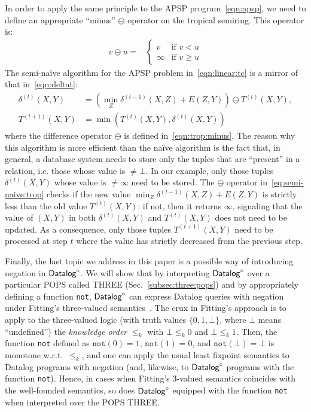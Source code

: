 In order to apply the same principle to the APSP
program~\eqref{eqn:apsp}, we need to define an appropriate ``minus''
$\ominus$ operator on the tropical semiring.  This operator is:
%
\begin{align}
  v\ominus u=&
        \begin{cases} v &\mbox{if } v < u\\
          \infty &\mbox{if } v \geq u
        \end{cases} \label{eqn:trop:minus}
\end{align}
%
The semi-na\"ive algorithm for the APSP problem in~\eqref{eqn:linear:tc}
is a mirror of that in~\eqref{eqn:deltat}:
%
\begin{align}
  \delta^{(t)}(X,Y) &= (\min_Z \delta^{(t-1)}(X,Z) + E(Z,Y)) \ominus T^{(t)}(X,Y), \label{eq:semi-naive:trop}\\
  T^{(t+1)}(X,Y) &= \min(T^{(t)}(X,Y), \delta^{(t)}(X,Y))\nonumber
\end{align}
%
where the difference operator $\ominus$ is defined
in~\eqref{eqn:trop:minus}. The reason why this algorithm is more
efficient than the na\"ive algorithm is the fact that, in general, a
database system needs to store only the tuples that are ``present'' in
a relation, i.e. those whose value is $\neq \bot$.  In our example,
only those tuples $\delta^{(t)}(X,Y)$ whose value is $\neq \infty$
need to be stored.  The $\ominus$ operator
in~\eqref{eq:semi-naive:trop} checks if the new value
$\min_Z \delta^{(t-1)}(X,Z) + E(Z,Y)$ is strictly less than the old
value $T^{(t)}(X,Y)$: if not, then it returns $\infty$, signaling that
the value of $(X,Y)$ in both $\delta^{(t)}(X,Y)$ and $T^{(t)}(X,Y)$
does not need to be updated.  As a consequence, only those tuples
$T^{(t+1)}(X,Y)$ need to be processed at step $t$ where the value has
strictly decreased from the previous step.



Finally, the last topic we address in this paper is a possible way of
introducing negation in $\text{\sf Datalog}^\circ$.  We will show that by interpreting
$\text{\sf Datalog}^\circ$ over a particular POPS called THREE
(Sec.~\ref{subsec:three:pops}) and by appropriately defining a
function \texttt{not}, $\text{\sf Datalog}^\circ$ can express Datalog queries with
negation under Fitting's three-valued
semantics~\cite{DBLP:journals/jlp/Fitting85a}.  The crux in Fitting's
approach is to apply to the three-valued logic
(with truth values $\{0, 1,\bot\}$, where $\bot$ means ``undefined'')
the
{\em knowledge order} $\leq_k$ with $\bot \leq_k 0$ and
$\bot \leq_k 1$. Then, the function \texttt{not} defined as
$\mathtt{not}(0) = 1$, $\mathtt{not}(1) = 0$, and
$\mathtt{not}(\bot) = \bot$ is monotone w.r.t.\ $\leq_k$, and one can
apply the usual least fixpoint semantics to Datalog programs with
negation (and, likewise, to $\text{\sf Datalog}^\circ$ programs with the function
\texttt{not}).  Hence, in cases when Fitting's 3-valued semantics
coincides with the well-founded semantics, so does $\text{\sf Datalog}^\circ$ equipped
with the function \texttt{not} when interpreted over the POPS THREE.

